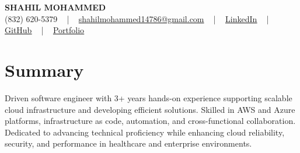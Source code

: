 \documentclass[letterpaper,10pt]{article}
\begin{document}
\begin{center}
    {\fontsize{14pt}{12pt}\selectfont \textbf{\MakeUppercase{Shahil Mohammed}}}\\ \vspace{2pt}
    \fontsize{10pt}{12pt}\selectfont (832) 620-5379 ~ | ~ \href{mailto:shahilmohammed14786@gmail.com}{shahilmohammed14786@gmail.com} ~ | ~  
    \href{https://www.linkedin.com/in/shahil-mohammed-9652931a1/}{\color{blue}\underline{LinkedIn}}  ~ | ~ 
    \href{https://github.com/freakbeast14}{\color{blue}\underline{GitHub}} ~ | ~ 
    \href{https://shahil-mohammed.netlify.app/}{\color{blue}\underline{Portfolio}}
    \vspace{-8pt}
\end{center}

\section{Summary}
\vspace{-2pt}\fontsize{8pt}{9pt}\selectfont
Driven software engineer with 3+ years hands-on experience supporting scalable cloud infrastructure and developing efficient solutions. Skilled in AWS and Azure platforms, infrastructure as code, automation, and cross-functional collaboration. Dedicated to advancing technical proficiency while enhancing cloud reliability, security, and performance in healthcare and enterprise environments.
 \vspace{-5pt}
 
\vspace{-2pt}
\end{document}
